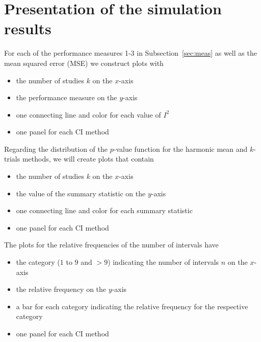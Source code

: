 \documentclass[letterpaper, 12pt]{article}
\begin{document}
\section{Presentation of the simulation results}
For each of the performance measures 1-3 in Subsection~\ref{sec:meas} as well as
the mean squared error (MSE) we construct plots with

\begin{itemize}
\item the number of studies $k$ on the $x$-axis
\item the performance measure on the $y$-axis
\item one connecting line and color for each value of $I^2$
\item one panel for each CI method
\end{itemize}

Regarding the distribution of the $p$-value function for the harmonic mean
and $k$-trials methods, we will create plots that contain
\begin{itemize}
\item the number of studies $k$ on the $x$-axis
\item the value of the summary statistic on the $y$-axis
\item one connecting line and color for each summary statistic
\item one panel for each CI method
\end{itemize}

The plots for the relative frequencies of the number of intervals have
\begin{itemize}
\item the category ($1$ to $9$ and $>9$) indicating the number of intervals
  $n$ on the $x$-axis
\item the relative frequency on the $y$-axis
\item a bar for each category indicating the relative frequency for the
  respective category
\item one panel for each CI method
\end{itemize}


\newpage


\end{document}
